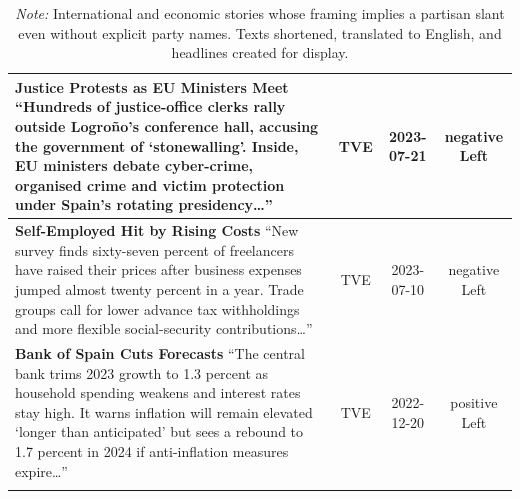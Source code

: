 \documentclass[12pt]{article}
\begin{document}
\begin{center}
\begin{longtable}{|p{8cm}|c|c|c|}
	\textbf{Justice Protests as EU Ministers Meet}\newline
	{\scriptsize“Hundreds of justice-office clerks rally outside Logroño’s conference hall, accusing the government of ‘stonewalling’.  Inside, EU ministers debate cyber-crime, organised crime and victim protection under Spain’s rotating presidency…”}
	& TVE & 2023-07-21 & negative Left\\
	\hline
	
	\textbf{Self-Employed Hit by Rising Costs}\newline
	{\scriptsize“New survey finds sixty-seven percent of freelancers have raised their prices after business expenses jumped almost twenty percent in a year.  Trade groups call for lower advance tax withholdings and more flexible social-security contributions…”}
	& TVE & 2023-07-10 & negative Left\\
	\hline
	
	\textbf{Bank of Spain Cuts Forecasts}\newline
	{\scriptsize“The central bank trims 2023 growth to 1.3 percent as household spending weakens and interest rates stay high.  It warns inflation will remain elevated ‘longer than anticipated’ but sees a rebound to 1.7 percent in 2024 if anti-inflation measures expire…”}
	& TVE & 2022-12-20 & positive Left\\
	\hline
	
	\caption*{\small \textit{Note:} International and economic stories whose framing implies a partisan slant even without explicit party names.  Texts shortened, translated to English, and headlines created for display.}
	\label{tab:international}
\end{longtable}

\end{center}
\end{document}
